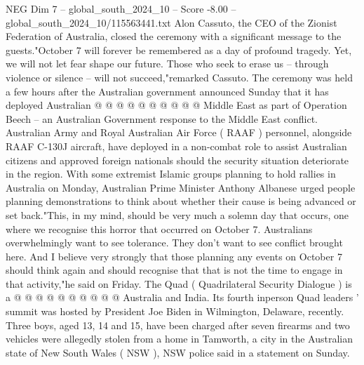 \begin{textsample}{NEG Dim 7 – global\_south\_2024\_10 – Score -8.00 – global\_south\_2024\_10/115563441.txt}
Alon Cassuto, the CEO of the Zionist Federation of Australia, closed the ceremony with a significant message to the guests."October 7 will forever be remembered as a day of profound tragedy.
Yet, we will not let fear shape our future.
Those who seek to erase us -- through violence or silence -- will not succeed,"remarked Cassuto.
The ceremony was held a few hours after the Australian government announced Sunday that it has deployed Australian @ @ @ @ @ @ @ @ @ @ Middle East as part of Operation Beech -- an Australian Government response to the Middle East conflict.
Australian Army and Royal Australian Air Force ( RAAF ) personnel, alongside RAAF C-130J aircraft, have deployed in a non-combat role to assist Australian citizens and approved foreign nationals should the security situation deteriorate in the region.
With some extremist Islamic groups planning to hold rallies in Australia on Monday, Australian Prime Minister Anthony Albanese urged people planning demonstrations to think about whether their cause is being advanced or set back."This, in my mind, should be very much a solemn day that occurs, one where we recognise this horror that occurred on October 7.
Australians overwhelmingly want to see tolerance.
They don't want to see conflict brought here.
And I believe very strongly that those planning any events on October 7 should think again and should recognise that that is not the time to engage in that activity,"he said on Friday.
The Quad ( Quadrilateral Security Dialogue ) is a @ @ @ @ @ @ @ @ @ @ Australia and India.
Its fourth inperson Quad leaders ' summit was hosted by President Joe Biden in Wilmington, Delaware, recently.
Three boys, aged 13, 14 and 15, have been charged after seven firearms and two vehicles were allegedly stolen from a home in Tamworth, a city in the Australian state of New South Wales ( NSW ), NSW police said in a statement on Sunday.

\end{textsample}

